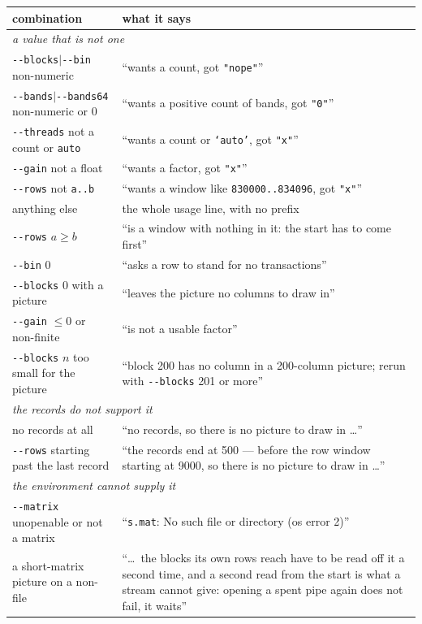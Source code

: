 \documentclass[11pt,a4paper]{article}
\newcommand{\flag}[1]{\texttt{-{}-#1}}
\begin{document}
\begin{table}[p]
\centering\small
\begin{tabular}{p{}p{}}
\toprule
combination & what it says \\
\midrule
\multicolumn{2}{l}{\emph{a value that is not one}} \\
\flag{blocks}$|$\flag{bin} non-numeric & ``wants a count, got \texttt{"nope"}'' \\
\flag{bands}$|$\flag{bands64} non-numeric or 0 & ``wants a positive count of bands, got \texttt{"0"}'' \\
\flag{threads} not a count or \texttt{auto} & ``wants a count or \texttt{`auto'}, got \texttt{"x"}'' \\
\flag{gain} not a float & ``wants a factor, got \texttt{"x"}'' \\
\flag{rows} not \texttt{a..b} & ``wants a window like \texttt{830000..834096}, got \texttt{"x"}'' \\
anything else & the whole usage line, with no prefix \\
\flag{rows} $a \ge b$ & ``is a window with nothing in it: the start has to come first'' \\
\flag{bin} 0 & ``asks a row to stand for no transactions'' \\
\flag{blocks} 0 with a picture & ``leaves the picture no columns to draw in'' \\
\flag{gain} $\le 0$ or non-finite & ``is not a usable factor'' \\
\flag{blocks} $n$ too small for the picture & ``block 200 has no column in a 200-column picture; rerun with \flag{blocks} 201 or more'' \\
\midrule
\multicolumn{2}{l}{\emph{the records do not support it}} \\
no records at all & ``no records, so there is no picture to draw in \ldots'' \\
\flag{rows} starting past the last record & ``the records end at 500 --- before the row window starting at 9000, so there is no picture to draw in \ldots'' \\
\midrule
\multicolumn{2}{l}{\emph{the environment cannot supply it}} \\
\flag{matrix} unopenable or not a matrix & ``\texttt{s.mat}: No such file or directory (os error 2)'' \\
a short-matrix picture on a non-file & ``\ldots\ the blocks its own rows reach have to be read off it a second time, and a second read from the start is what a stream cannot give: opening a spent pipe again does not fail, it waits'' \\

\end{tabular}
\end{table}
\end{document}
